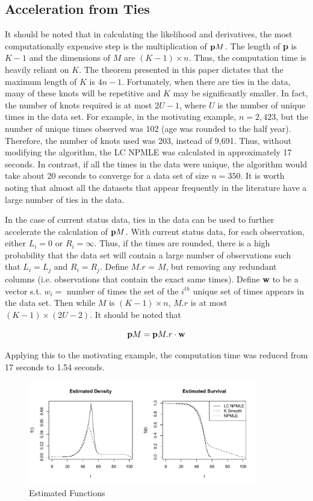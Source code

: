 \documentclass[10pt]{article}
\begin{document}
	
	{\subsection{Acceleration from Ties} } 
	
	It should be noted that in calculating the likelihood and derivatives, the most computationally expensive step is the multiplication of $ {\bf p}M $. The length of {\bf p} is $K-1$ and the dimensions of $M$ are $(K-1) \times n$. Thus, the computation time is heavily reliant on $K$. The theorem presented in this paper dictates that the maximum length of $K$ is $4n - 1$. Fortunately, when there are ties in the data, many of these knots will be repetitive and $K$ may be significantly smaller. In fact, the number of knots required is at most $2U - 1$, where $U$ is the number of unique times in the data set. For example, in the motivating example, $n = 2,423$, but the number of unique times observed was 102 (age was rounded to the half year). Therefore, the number of knots used was 203, instead of 9,691. Thus, without modifying the algorithm, the LC NPMLE was calculated in approximately 17 seconds. In contrast, if all the times in the data were unique, the algorithm would take about 20 seconds to converge for a data set of size $n = 350$. It is worth noting that almost all the datasets that appear frequently in the literature have a large number of ties in the data.
	
	In the case of current status data, ties in the data can be used to further accelerate the calculation of ${\bf p} M$. With current status data, for each observation, either $L_i = 0$ or $R_i = \infty$. Thus, if the times are rounded, there is a high probability that the data set will contain a large number of observations such that $L_i = L_j$ and $R_i = R_j$. Define $M.r$ = $M$, but removing any redundant columns (i.e. observations that contain the exact same times). Define {\bf w} to be a vector s.t. $w_i =$ number of times the set of the $i^{th}$ unique set of times appears in the data set. Then while $M$ is $(K-1) \times n$, $M.r$ is at most $(K-1) \times (2U - 2)$. It should be noted that
	
	\[ {\bf p} M = {\bf p} M.r \cdot {\bf w}
	\] 

	Applying this to the motivating example, the computation time was reduced from 17 seconds to 1.54 seconds. 

\begin{figure}[h]
\centerline{\includegraphics[width = 10cm]{FullMenoPlot.pdf}}
\caption{Estimated Functions}
\end{figure}		
\end{document}
